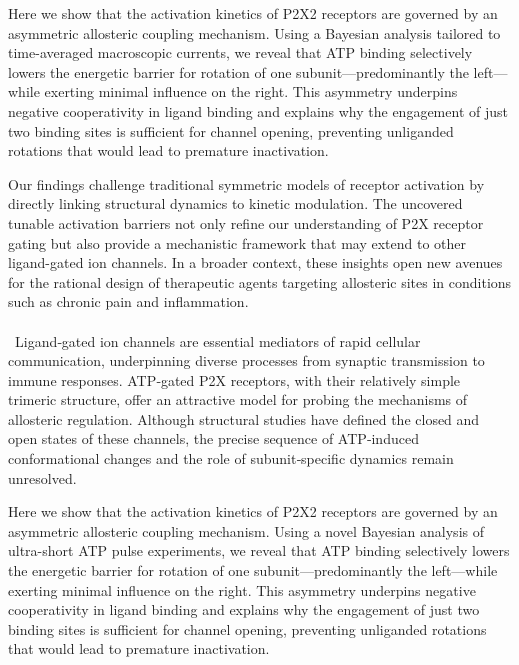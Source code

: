 \documentclass[a4paper,12pt]{article}
\begin{document}
Here we show that the activation kinetics of P2X2 receptors are governed by an asymmetric allosteric coupling mechanism. Using a Bayesian analysis tailored to time-averaged macroscopic currents, we reveal that ATP binding selectively lowers the energetic barrier for rotation of one subunit—predominantly the left—while exerting minimal influence on the right. This asymmetry underpins negative cooperativity in ligand binding and explains why the engagement of just two binding sites is sufficient for channel opening, preventing unliganded rotations that would lead to premature inactivation.  

Our findings challenge traditional symmetric models of receptor activation by directly linking structural dynamics to kinetic modulation. The uncovered tunable activation barriers not only refine our understanding of P2X receptor gating but also provide a mechanistic framework that may extend to other ligand-gated ion channels. In a broader context, these insights open new avenues for the rational design of therapeutic agents targeting allosteric sites in conditions such as chronic pain and inflammation.\\\\\ 
Ligand‐gated ion channels are essential mediators of rapid cellular communication, underpinning diverse processes from synaptic transmission to immune responses. ATP‐gated P2X receptors, with their relatively simple trimeric structure, offer an attractive model for probing the mechanisms of allosteric regulation. Although structural studies have defined the closed and open states of these channels, the precise sequence of ATP‐induced conformational changes and the role of subunit‐specific dynamics remain unresolved.

Here we show that the activation kinetics of P2X2 receptors are governed by an asymmetric allosteric coupling mechanism. Using a novel Bayesian analysis of ultra-short ATP pulse experiments, we reveal that ATP binding selectively lowers the energetic barrier for rotation of one subunit—predominantly the left—while exerting minimal influence on the right. This asymmetry underpins negative cooperativity in ligand binding and explains why the engagement of just two binding sites is sufficient for channel opening, preventing unliganded rotations that would lead to premature inactivation.
\end{document}
